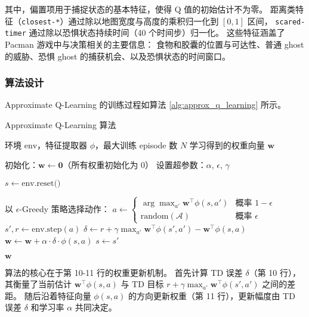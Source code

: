 其中，偏置项用于捕捉状态的基本特征，使得 Q 值的初始估计不为零。
距离类特征（\texttt{closest-*}）通过除以地图宽度与高度的乘积归一化到 $[0,1]$ 区间，
\texttt{scared-timer} 通过除以恐惧状态持续时间（40 个时间步）归一化。
这些特征涵盖了 Pacman 游戏中与决策相关的主要信息：
食物和胶囊的位置与可达性、普通 ghost 的威胁、恐惧 ghost 的捕获机会、以及恐惧状态的时间窗口。

\subsubsection{算法设计}

Approximate Q-Learning 的训练过程如算法 \ref{alg:approx_q_learning} 所示。

\begin{algorithm}[h]
    \caption{Approximate Q-Learning 算法}
    \small
    \label{alg:approx_q_learning}
    \begin{algorithmic}[1]
        \Require 环境 $\text{env}$，特征提取器 $\phi$，最大训练 episode 数 $N$
        \Ensure 学习得到的权重向量 $\mathbf{w}$
        
        \State 初始化：$\mathbf{w} \leftarrow \mathbf{0}$（所有权重初始化为 0）
        \State 设置超参数：$\alpha$, $\epsilon$, $\gamma$
        
            \State $s \leftarrow \text{env.reset()}$
            
                \State 以 $\epsilon$-Greedy 策略选择动作：
                \State \quad $a \leftarrow \begin{cases} 
                    \arg\max_{a'} \mathbf{w}^\top \phi(s, a') & \text{概率 } 1-\epsilon \\
                    \text{random}(\mathcal{A}) & \text{概率 } \epsilon
                \end{cases}$
                \State $s', r \leftarrow \text{env.step}(a)$
                \State $\delta \leftarrow r + \gamma \max_{a'} \mathbf{w}^\top \phi(s', a') - \mathbf{w}^\top \phi(s, a)$ 
                \State $\mathbf{w} \leftarrow \mathbf{w} + \alpha \cdot \delta \cdot \phi(s, a)$ 
                \State $s \leftarrow s'$
            \EndWhile
        \EndFor
        
        \Return $\mathbf{w}$
    \end{algorithmic}
\end{algorithm}

算法的核心在于第 10-11 行的权重更新机制。
首先计算 TD 误差 $\delta$（第 10 行），其衡量了当前估计 $\mathbf{w}^\top \phi(s, a)$ 与 TD 目标 $r + \gamma \max_{a'} \mathbf{w}^\top \phi(s', a')$ 之间的差距。
随后沿着特征向量 $\phi(s, a)$ 的方向更新权重（第 11 行），更新幅度由 TD 误差 $\delta$ 和学习率 $\alpha$ 共同决定。

